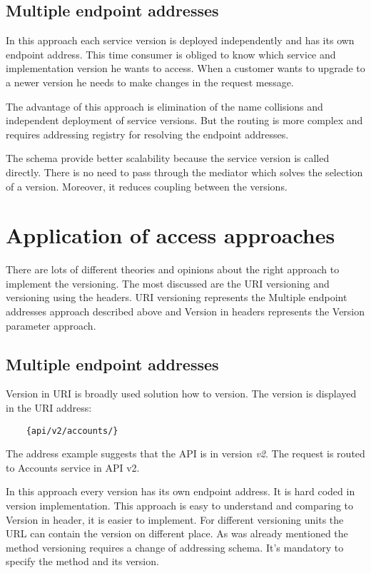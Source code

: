 \subsection{Multiple endpoint addresses}
In this approach each service version is deployed independently and has its own endpoint address. This time consumer is obliged to know which service and implementation version he wants to access. When a customer wants to upgrade to a newer version he needs to make changes in the request message. 

The advantage of this approach is elimination of the name collisions and independent deployment of service versions. But the routing is more complex and requires addressing registry for resolving the endpoint addresses.

The schema provide better scalability because the service version is called directly. There is no need to pass through the mediator which solves the selection of a version. Moreover, it reduces coupling between the versions.


\section{Application of access approaches}
There are lots of different theories and opinions about the right approach to implement the versioning. The most discussed are the URI versioning and versioning using the headers. URI versioning represents the Multiple endpoint addresses approach described above and Version in headers represents the Version parameter approach.


\subsection{Multiple endpoint addresses}
Version in URI is broadly used solution how to version. The version is displayed in the URI address:

\begin{lstlisting}
    {api/v2/accounts/}
\end{lstlisting}

The address example suggests that the API is in version \emph{v2}. The request is routed to Accounts service in API v2.

\bigskip

In this approach every version has its own endpoint address. It is hard coded in version implementation. This approach is easy to understand and comparing to Version in header, it is easier to implement. For different versioning units the URL can contain the version on different place. As was already mentioned the method versioning requires a change of addressing schema. It's mandatory to specify the method and its version. 


